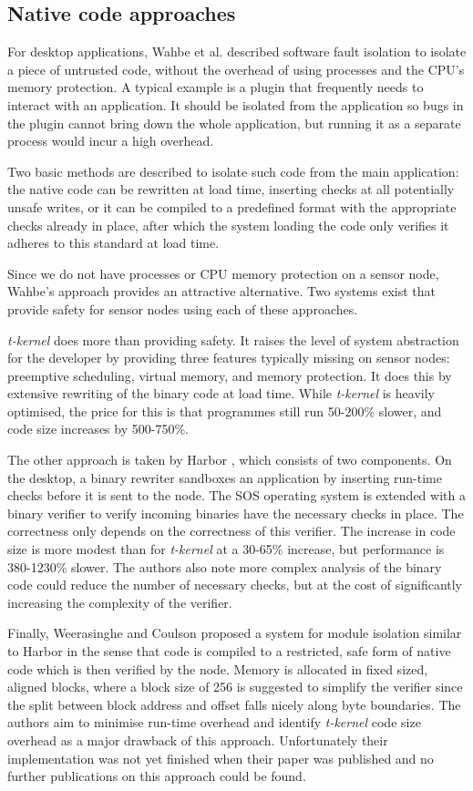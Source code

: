 \subsection{Native code approaches}
For desktop applications, Wahbe et al. described software fault isolation \cite{Wahbe:1994cj} to isolate a piece of untrusted code, without the overhead of using processes and the CPU's memory protection. A typical example is a plugin that frequently needs to interact with an application. It should be isolated from the application so bugs in the plugin cannot bring down the whole application, but running it as a separate process would incur a high overhead.

Two basic methods are described to isolate such code from the main application: the native code can be rewritten at load time, inserting checks at all potentially unsafe writes, or it can be compiled to a predefined format with the appropriate checks already in place, after which the system loading the code only verifies it adheres to this standard at load time.

Since we do not have processes or CPU memory protection on a sensor node, Wahbe's approach provides an attractive alternative. Two systems exist that provide safety for sensor nodes using each of these approaches.

\emph{t-kernel} \cite{Gu:2006ww} does more than providing safety. It raises the level of system abstraction for the developer by providing three features typically missing on sensor nodes: preemptive scheduling, virtual memory, and memory protection. It does this by extensive rewriting of the binary code at load time. While \emph{t-kernel} is heavily optimised, the price for this is that programmes still run 50-200\% slower, and code size increases by 500-750\%.

The other approach is taken by Harbor \cite{Kumar:2007ge}, which consists of two components. On the desktop, a binary rewriter sandboxes an application by inserting run-time checks before it is sent to the node. The SOS operating system \cite{Han:2005th} is extended with a binary verifier to verify incoming binaries have the necessary checks in place. The correctness only depends on the correctness of this verifier. The increase in code size is more modest than for \emph{t-kernel} at a 30-65\% increase, but performance is 380-1230\% slower. The authors also note more complex analysis of the binary code could reduce the number of necessary checks, but at the cost of significantly increasing the complexity of the verifier.

Finally, Weerasinghe and Coulson \cite{Weerasinghe:2008kh} proposed a system for module isolation similar to Harbor in the sense that code is compiled to a restricted, safe form of native code which is then verified by the node. Memory is allocated in fixed sized, aligned blocks, where a block size of 256 is suggested to simplify the verifier since the split between block address and offset falls nicely along byte boundaries. The authors aim to minimise run-time overhead and identify \emph{t-kernel} code size overhead as a major drawback of this approach. Unfortunately their implementation was not yet finished when their paper was published and no further publications on this approach could be found.
